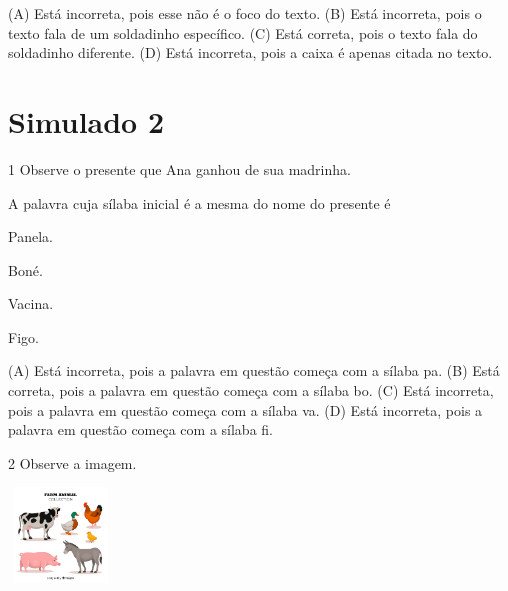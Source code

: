 (A) Está incorreta, pois esse não é o foco do texto.
(B) Está incorreta, pois o texto fala de um soldadinho específico.
(C) Está correta, pois o texto fala do soldadinho diferente.
(D) Está incorreta, pois a caixa é apenas citada no texto.

\chapter{Simulado 2}

\num{1} Observe o presente que Ana ganhou de sua madrinha.


A palavra cuja sílaba inicial é a mesma do nome do presente é

\begin{minipage}{.5\textwidth}
\begin{escolha}
\item Panela.

\item Boné.

\item Vacina.

\item Figo.
\end{escolha}
\end{minipage}

(A) Está incorreta, pois a palavra em questão começa com a sílaba pa.
(B) Está correta, pois a palavra em questão começa com a sílaba bo.
(C) Está incorreta, pois a palavra em questão começa com a sílaba va.
(D) Está incorreta, pois a palavra em questão começa com a sílaba fi.

\num{2} Observe a imagem.

\includegraphics[width=1.10000in,height=0.99236in]{media/image148.jpeg}


